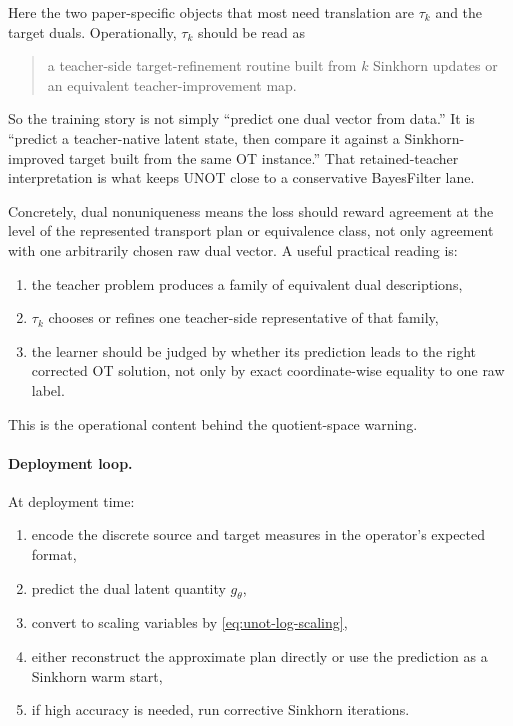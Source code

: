 \documentclass[11pt]{report}
\begin{document}
Here the two paper-specific objects that most need translation are $\tau_k$ and the
target duals.  Operationally, $\tau_k$ should be read as
\begin{quote}
a teacher-side target-refinement routine built from $k$ Sinkhorn updates or an
equivalent teacher-improvement map.
\end{quote}
So the training story is not simply ``predict one dual vector from data.''  It is
``predict a teacher-native latent state, then compare it against a Sinkhorn-improved
target built from the same OT instance.''  That retained-teacher interpretation is
what keeps UNOT close to a conservative BayesFilter lane.

Concretely, dual nonuniqueness means the loss should reward agreement at the level
of the represented transport plan or equivalence class, not only agreement with one
arbitrarily chosen raw dual vector.  A useful practical reading is:
\begin{enumerate}[label=(\roman*)]
  \item the teacher problem produces a family of equivalent dual descriptions,
  \item $\tau_k$ chooses or refines one teacher-side representative of that family,
  \item the learner should be judged by whether its prediction leads to the right corrected OT solution, not only by exact coordinate-wise equality to one raw label.
\end{enumerate}
This is the operational content behind the quotient-space warning.

\paragraph{Deployment loop.}
At deployment time:
\begin{enumerate}[label=(\arabic*)]
  \item encode the discrete source and target measures in the operator's expected format,
  \item predict the dual latent quantity $g_\theta$,
  \item convert to scaling variables by \eqref{eq:unot-log-scaling},
  \item either reconstruct the approximate plan directly or use the prediction as a Sinkhorn warm start,
  \item if high accuracy is needed, run corrective Sinkhorn iterations.
\end{enumerate}
\end{document}
